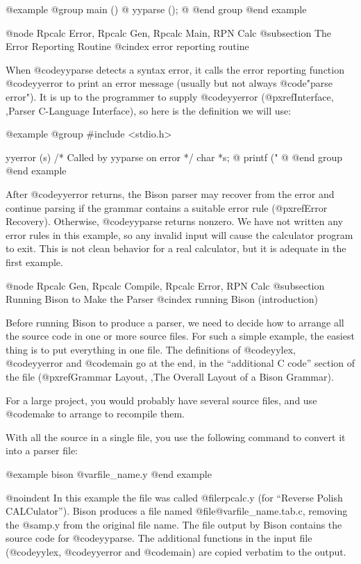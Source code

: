 {{{@example
@group
main ()
@{
  yyparse ();
@}
@end group
@end example

@node Rpcalc Error, Rpcalc Gen, Rpcalc Main, RPN Calc
@subsection The Error Reporting Routine
@cindex error reporting routine

When @code{yyparse} detects a syntax error, it calls the error reporting
function @code{yyerror} to print an error message (usually but not always
@code{"parse error"}).  It is up to the programmer to supply @code{yyerror}
(@pxref{Interface, ,Parser C-Language Interface}), so here is the definition we will use:

@example
@group
#include <stdio.h>

yyerror (s)  /* Called by yyparse on error */
     char *s;
@{
  printf ("%
@}
@end group
@end example

After @code{yyerror} returns, the Bison parser may recover from the error
and continue parsing if the grammar contains a suitable error rule
(@pxref{Error Recovery}).  Otherwise, @code{yyparse} returns nonzero.  We
have not written any error rules in this example, so any invalid input will
cause the calculator program to exit.  This is not clean behavior for a
real calculator, but it is adequate in the first example.

@node Rpcalc Gen, Rpcalc Compile, Rpcalc Error, RPN Calc
@subsection Running Bison to Make the Parser
@cindex running Bison (introduction)

Before running Bison to produce a parser, we need to decide how to arrange
all the source code in one or more source files.  For such a simple example,
the easiest thing is to put everything in one file.  The definitions of
@code{yylex}, @code{yyerror} and @code{main} go at the end, in the
``additional C code'' section of the file (@pxref{Grammar Layout, ,The Overall Layout of a Bison Grammar}).

For a large project, you would probably have several source files, and use
@code{make} to arrange to recompile them.

With all the source in a single file, you use the following command to
convert it into a parser file:

@example
bison @var{file_name}.y
@end example

@noindent
In this example the file was called @file{rpcalc.y} (for ``Reverse Polish
CALCulator'').  Bison produces a file named @file{@var{file_name}.tab.c},
removing the @samp{.y} from the original file name. The file output by
Bison contains the source code for @code{yyparse}.  The additional
functions in the input file (@code{yylex}, @code{yyerror} and @code{main})
are copied verbatim to the output.

}}}
